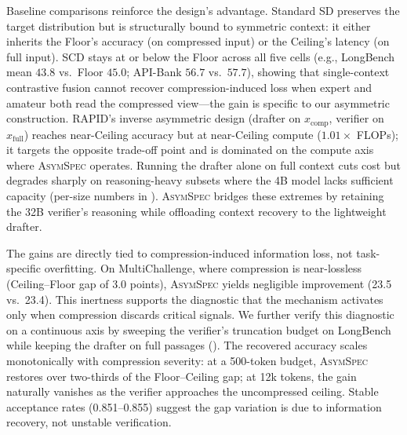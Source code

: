 \documentclass[11pt]{article}
\theoremstyle{plain}
\theoremstyle{definition}
\begin{document}
Baseline comparisons reinforce the design's advantage. Standard SD preserves the target distribution but is structurally bound to symmetric context: it either inherits the Floor's accuracy (on compressed input) or the Ceiling's latency (on full input). SCD stays at or below the Floor across all five cells (e.g., LongBench mean $43.8$ vs.\ Floor $45.0$; API-Bank $56.7$ vs.\ $57.7$), showing that single-context contrastive fusion cannot recover compression-induced loss when expert and amateur both read the compressed view---the gain is specific to our asymmetric construction. RAPID's inverse asymmetric design (drafter on $x_{\text{comp}}$, verifier on $x_{\text{full}}$) reaches near-Ceiling accuracy but at near-Ceiling compute ($1.01\times$ FLOPs); it targets the opposite trade-off point and is dominated on the compute axis where \textsc{AsymSpec} operates. Running the drafter alone on full context cuts cost but degrades sharply on reasoning-heavy subsets where the 4B model lacks sufficient capacity (per-size numbers in ). \textsc{AsymSpec} bridges these extremes by retaining the 32B verifier's reasoning while offloading context recovery to the lightweight drafter.


The gains are directly tied to compression-induced information loss, not task-specific overfitting. On MultiChallenge, where compression is near-lossless (Ceiling--Floor gap of 3.0 points), \textsc{AsymSpec} yields negligible improvement (23.5 vs.\ 23.4). This inertness supports the diagnostic that the mechanism activates only when compression discards critical signals. We further verify this diagnostic on a continuous axis by sweeping the verifier's truncation budget on LongBench while keeping the drafter on full passages (). The recovered accuracy scales monotonically with compression severity: at a 500-token budget, \textsc{AsymSpec} restores over two-thirds of the Floor--Ceiling gap; at 12k tokens, the gain naturally vanishes as the verifier approaches the uncompressed ceiling. Stable acceptance rates (0.851--0.855) suggest the gap variation is due to information recovery, not unstable verification.

\end{document}

